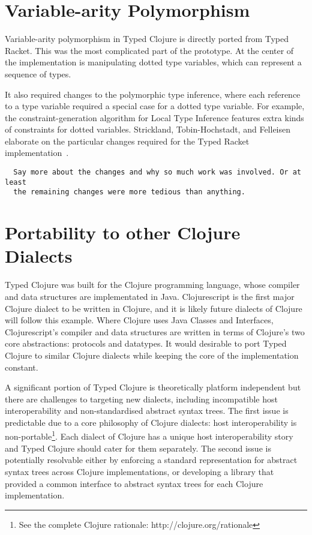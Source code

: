 \section{Variable-arity Polymorphism}

Variable-arity polymorphism in Typed Clojure is directly ported from Typed Racket.
This was the most complicated part of the prototype. At the center of the implementation
is manipulating dotted type variables, which can represent a sequence of types.

It also required changes to the polymorphic type inference, where each
reference to a type variable required a special case for a dotted type variable.
For example, the constraint-generation algorithm for Local Type Inference
features extra kinds of constraints for dotted variables.
Strickland, Tobin-Hochstadt, and Felleisen elaborate on the particular changes
required for the Typed Racket implementation~\cite{STF09}.

\begin{verbatim}
  Say more about the changes and why so much work was involved. Or at least
  the remaining changes were more tedious than anything.
\end{verbatim}

\section{Portability to other Clojure Dialects}

Typed Clojure was built for the Clojure programming language, whose compiler
and data structures are implementated in Java. Clojurescript is the first major Clojure dialect
to be written in Clojure, and it is likely future dialects of Clojure will follow this example. 
Where Clojure uses Java Classes and Interfaces, 
Clojurescript's compiler and data structures are written in terms of Clojure's
two core abstractions: protocols and datatypes.
It would desirable to port Typed Clojure to similar  Clojure dialects while keeping
the core of the implementation constant.

A significant portion of Typed Clojure is theoretically platform independent but there are
challenges to targeting new dialects, including incompatible host interoperability and
non-standardised abstract syntax trees.
The first issue is predictable due to a core philosophy of Clojure dialects: 
host interoperability is non-portable\footnote{See the complete Clojure rationale: http://clojure.org/rationale}.
Each dialect of Clojure has a unique host interoperability story and Typed Clojure should cater for them
separately.
The second issue is potentially resolvable either by enforcing a standard representation for 
abstract syntax trees across Clojure implementations, or developing a library that provided
a common interface to abstract syntax trees for each Clojure implementation.

